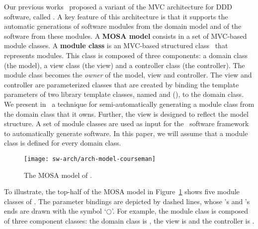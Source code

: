 Our previous works~\cite{le_tree-based_2015, le_generative_2018} proposed a variant of the MVC architecture for DDD software, called . A key feature of this architecture is that it supports the automatic generations of software modules from the domain model and of the software from these modules.
%
A \textbf{MOSA model} consists in a set of MVC-based module classes. 
A \textbf{module class} is an MVC-based structured class~\cite{omg_unified_2015} that represents modules. This class is composed of three components: a domain class (the model), a view class (the view) and a controller class (the controller). The module class becomes the \textit{owner} of the model, view and controller. The view and controller are parameterized classes that are created by binding the template parameters of two library template classes, named  and  (\resp), to the domain class.
%
We present in~\cite{le_generative_2018} a technique for semi-automatically generating a module class from the domain class that it owns. Further, the view is designed to reflect the model structure. A set of module classes are used as input for the \jdomainapp~software framework~\cite{le_jdomainapp_2017} to automatically generate software. In this paper, we will assume that a module class is defined for every domain class.

\begin{figure}[ht]
	\centering
	\texttt{[image: sw-arch/arch-model-courseman]}
	\caption{The MOSA model of \courseman.} %
	\label{fig:arch-model-courseman}
\end{figure}

%
To illustrate, the top-half of the MOSA model in Figure~\ref{fig:arch-model-courseman} shows five module classes of \courseman. The parameter bindings are depicted by dashed lines, whose 's and 's ends are drawn with the symbol `$\bigcirc$'. 
%
For example, the module class  is composed of three component classes: the domain class is , the view is  and the controller is .

